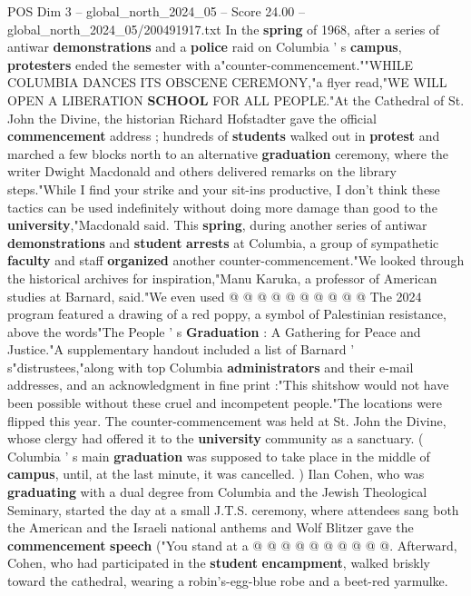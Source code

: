 \begin{textsample}{POS Dim 3 – global\_north\_2024\_05 – Score 24.00 – global\_north\_2024\_05/200491917.txt}  \label{ex:f3_pos_006}
In the \textbf{spring} of 1968, after a series of antiwar \textbf{demonstrations} and a \textbf{police} raid on Columbia ' s \textbf{campus}, \textbf{protesters} ended the semester with a"counter-commencement.""WHILE COLUMBIA DANCES ITS OBSCENE CEREMONY,"a flyer read,"WE WILL OPEN A LIBERATION \textbf{SCHOOL} FOR ALL PEOPLE."At the Cathedral of St.
John the Divine, the historian Richard Hofstadter gave the official \textbf{commencement} address ; hundreds of \textbf{students} walked out in \textbf{protest} and marched a few blocks north to an alternative \textbf{graduation} ceremony, where the writer Dwight Macdonald and others delivered remarks on the library steps."While I find your strike and your sit-ins productive, I don't think these tactics can be used indefinitely without doing more damage than good to the \textbf{university},"Macdonald said.
This \textbf{spring}, during another series of antiwar \textbf{demonstrations} and \textbf{student} \textbf{arrests} at Columbia, a group of sympathetic \textbf{faculty} and staff \textbf{organized} another counter-commencement."We looked through the historical archives for inspiration,"Manu Karuka, a professor of American studies at Barnard, said."We even used @ @ @ @ @ @ @ @ @ @ The 2024 program featured a drawing of a red poppy, a symbol of Palestinian resistance, above the words"The People ' s \textbf{Graduation} : A Gathering for Peace and Justice."A supplementary handout included a list of Barnard ' s"distrustees,"along with top Columbia \textbf{administrators} and their e-mail addresses, and an acknowledgment in fine print :"This shitshow would not have been possible without these cruel and incompetent people."The locations were flipped this year.
The counter-commencement was held at St.
John the Divine, whose clergy had offered it to the \textbf{university} community as a sanctuary. ( Columbia ' s main \textbf{graduation} was supposed to take place in the middle of \textbf{campus}, until, at the last minute, it was cancelled. ) Ilan Cohen, who was \textbf{graduating} with a dual degree from Columbia and the Jewish Theological Seminary, started the day at a small J.T.S. ceremony, where attendees sang both the American and the Israeli national anthems and Wolf Blitzer gave the \textbf{commencement} \textbf{speech} ("You stand at a @ @ @ @ @ @ @ @ @ @.
Afterward, Cohen, who had participated in the \textbf{student} \textbf{encampment}, walked briskly toward the cathedral, wearing a robin's-egg-blue robe and a beet-red yarmulke.

\end{textsample}
